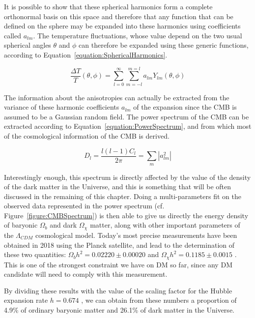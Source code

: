 \documentclass[a4paper, 10pt, openright]{report}
\begin{document}
It is possible to show that these spherical harmonics form a complete orthonormal basis on this space and therefore that any function that can be defined on the sphere may be expanded into these harmonics using coefficients called $a_{lm}$. The temperature fluctuations, whose value depend on the two usual spherical angles $\theta$ and $\phi$ can therefore be expanded using these generic functions, according to Equation~\ref{equation:SphericalHarmonics}.

\begin{equation} \label{equation:SphericalHarmonics}
\frac{\Delta T}{T}(\theta, \phi) = \sum_{l=0}^{\infty} \sum_{m=-l}^{m=l} a_{lm} Y_{lm} (\theta, \phi)
\end{equation}

The information about the anisotropies can actually be extracted from the variance of these harmonic coefficients $a_{lm}$ of the expansion since the \ac{CMB} is assumed to be a Gaussian random field. The power spectrum of the \ac{CMB} can be extracted according to Equation~\ref{equation:PowerSpectrum}, and from which most of the cosmological information of the \ac{CMB} is derived.

\begin{equation} \label{equation:PowerSpectrum}
D_l = \frac{l(l-1) C_l} {2\pi} = \sum_m |a_{lm}^2|
\end{equation}

Interestingly enough, this spectrum is directly affected by the value of the density of the dark matter in the Universe, and this is something that will be often discussed in the remaining of this chapter. Doing a multi-parameters fit on the observed data represented in the power spectrum (cf. Figure~\ref{figure:CMBSpectrum}) is then able to give us directly the energy density of baryonic $\Omega_b$ and dark $\Omega_\chi$ matter, along with other important parameters of the $\Lambda_{CDM}$ cosmological model. Today's most precise measurements have been obtained in 2018 using the Planck satellite, and lead to the determination of these two quantities: $\Omega_b h^2 = 0.02220 \pm 0.00020$ and $\Omega_\chi h^2 = 0.1185 \pm 0.0015$ \cite{Planck}. This is one of the strongest constraint we have on \ac{DM} so far, since any \ac{DM} candidate will need to comply with this measurement.

By dividing these results with the value of the scaling factor for the Hubble expansion rate $h = 0.674$ \cite{Constants}, we can obtain from these numbers a proportion of 4.9\% of ordinary baryonic matter and 26.1\% of dark matter in the Universe.
\end{document}
